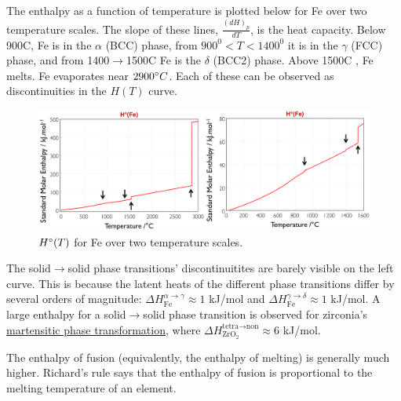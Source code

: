 \documentclass[12pt]{article}
\begin{document}
The enthalpy as a function of temperature is plotted below for Fe over two temperature scales. The slope of these lines, $\frac{(dH)_p}{dT}$, is the heat capacity.  Below 900\degree C, Fe is in the $\alpha$ (BCC) phase, from $900^0 < T < 1400^0$ it is in the $\gamma$ (FCC) phase, and from 1400$\to$1500\degree C Fe is the $\delta$ (BCC2) phase. Above 1500\degree C , Fe melts. Fe evaporates near $2900 \degree C$. Each of these can be observed as discontinuities in the $H(T)$ curve. \\
\begin{figure}[h]
\centering
\includegraphics[width = \textwidth]{H_of_T_labeled.png}
\caption{$H\degree (T)$ for Fe over two temperature scales.}
\end{figure}
The solid$\to$solid phase transitions' discontinuitites are barely visible on the left curve. This is because the latent heats of the different phase transitions differ by several orders of magnitude: $\Delta H_\text{Fe}^{\alpha \rightarrow \gamma} \approx 1$ kJ/mol and $\Delta H_\text{Fe}^{\gamma \rightarrow \delta} \approx 1$ kJ/mol. A large enthalpy for a solid$\to$solid phase transition is observed for zirconia's \href{http://en.wikipedia.org/wiki/Diffusionless_transformation#Martensitic_transformation}{martensitic phase transformation}, where $\Delta H_{\text{ZrO}_2}^{\text{tetra}\rightarrow \text{non}} \approx 6$ kJ/mol.  

The enthalpy of fusion (equivalently, the enthalpy of melting) is generally much higher. Richard's rule says that the enthalpy of fusion is proportional to the melting temperature of an element. 

\end{document}
